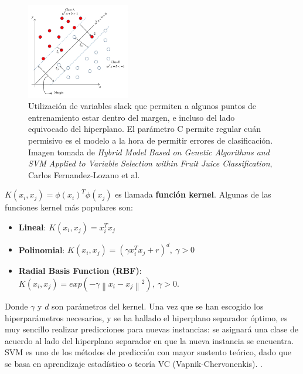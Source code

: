 \begin{figure}[h!]
\begin{center}
  \includegraphics[width=0.4\textwidth]{Kap1/slack.jpg} 
  \end{center}
 \caption{ Utilización de variables slack que permiten a algunos puntos de entrenamiento estar dentro del margen, e incluso del lado equivocado del hiperplano. El parámetro C permite regular cuán permisivo es el modelo a la hora de permitir errores de clasificación. Imagen tomada de \textit{Hybrid Model Based on Genetic Algorithms and SVM Applied to Variable Selection within Fruit Juice Classification}, Carlos Fernandez-Lozano et al. }
\label{fig:svm_5}
\end{figure}

$K(x_i,x_j) = \phi(x_i)^T \phi(x_j)$ es llamada \textbf{función kernel}. Algunas de las funciones kernel más populares son:

\begin{itemize}
\item \textbf{Lineal}: $K(x_i,x_j) = x_i^T x_j$
\item \textbf{Polinomial}: $K(x_i,x_j)= (\gamma x_i^T x_j + r)^d , \ \gamma > 0$
\item \textbf{Radial Basis Function (RBF)}: $K(x_i,x_j)= exp (-\gamma\left\| x_i - x_j \right\|^2  ), \ \gamma>0.$

\end{itemize}

Donde $\gamma$ y $d$ son parámetros del kernel. Una vez que se han escogido los hiperparámetros necesarios, y se ha hallado el hiperplano separador óptimo, es muy sencillo realizar predicciones para nuevas instancias: se asignará una clase de acuerdo al lado del hiperplano separador en que la nueva instancia se encuentra.  \\

SVM es uno de los métodos de predicción con mayor sustento teórico, dado que se basa en aprendizaje estadístico o teoría VC (Vapnik-Chervonenkis). \cite{vapnik71uniform} \cite{vapnik74theory}.

